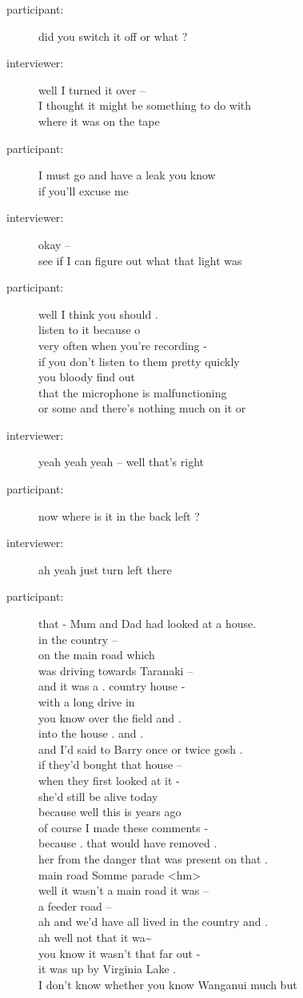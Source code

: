 \documentclass{article}
\newcommand{\turn}[2]{
\item[#1:] #2
}
\begin{document}
\begin{description}
\turn{participant}{did you switch it off or what ?}

\turn{interviewer}{well I turned it over --\\
I thought it might be something to do with\\
where it was on the tape}

\turn{participant}{I must go and have a leak you know\\
if you'll excuse me}

\turn{interviewer}{okay --\\
see if I can figure out what that light was}

\turn{participant}{well I think you should .\\
listen to it because o\\
very often when you're recording -\\
if you don't listen to them pretty quickly\\
you bloody find out\\
that the microphone is malfunctioning\\
or some and there's nothing much on it or }

\turn{interviewer}{yeah yeah yeah -- well that's right}

\turn{participant}{now where is it in the back left ?}

\turn{interviewer}{ah yeah just turn left there}

\turn{participant}{that - Mum and Dad had looked at a house.\\
in the country --\\
on the main road which\\
was driving towards Taranaki --\\
and it was a . country house -\\
with a long drive in\\
you know over the field and .\\
into the house . and .\\
and I'd said to Barry once or twice gosh .\\
if they'd bought that house --\\
when they first looked at it -\\
she'd still be alive today\\
because well this is years ago\\
of course I made these comments -\\
because . that would have removed .\\
her from the danger that was present on that .\\
main road Somme parade \textless hm\textgreater \\
well it wasn't a main road it was --\\
a feeder road --\\
ah and we'd have all lived in the country and .\\
ah well not that it wa\~{} \\
you know it wasn't that far out -\\
it was up by Virginia Lake .\\
I don't know whether you know Wanganui much but}


\end{description}
\end{document}
